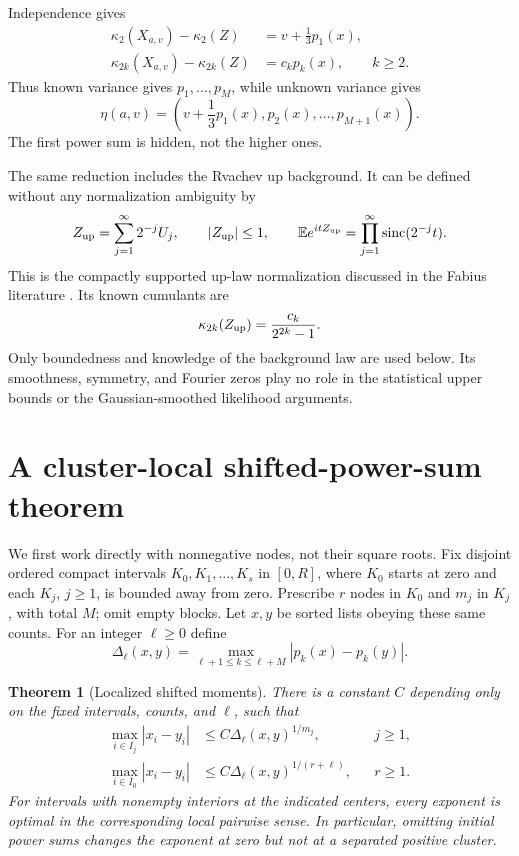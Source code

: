 \documentclass[11pt,a4paper]{article}
\numberwithin{equation}{section}
\newtheorem{theorem}{Theorem}[section]
\theoremstyle{definition}
\theoremstyle{remark}
\newcommand{\E}{\mathbb E}
\newcommand{\sinc}{\operatorname{sinc}}
\newcommand{\kap}{\kappa}
\begin{document}
Independence gives
\begin{align}
 \kap_2(X_{a,v})-\kap_2(Z)&=v+\frac13p_1(x),
 \label{eq:variancecoord}\\
 \kap_{2k}(X_{a,v})-\kap_{2k}(Z)&=c_kp_k(x),\qquad k\ge2.
 \label{eq:highcoords}
\end{align}
Thus known variance gives $p_1,\ldots,p_M$, while unknown variance gives
\begin{equation}
 \eta(a,v)=\left(v+\frac13p_1(x),p_2(x),\ldots,p_{M+1}(x)\right).
 \label{eq:eta}
\end{equation}
The first power sum is hidden, not the higher ones.

The same reduction includes the Rvachev up background. It can be defined
without any normalization ambiguity by
\begin{equation}
 Z_{\rm up}=\sum_{j=1}^\infty2^{-j}U_j,
 \qquad |Z_{\rm up}|\le1,
 \qquad \E e^{itZ_{\rm up}}=\prod_{j=1}^\infty\sinc(2^{-j}t).
 \label{eq:up}
\end{equation}
This is the compactly supported up-law normalization discussed in the Fabius
literature \cite{Arias}. Its known cumulants are
\begin{equation}
 \kap_{2k}(Z_{\rm up})=\frac{c_k}{2^{2k}-1}.
\end{equation}
Only boundedness and knowledge of the background law are used below. Its
smoothness, symmetry, and Fourier zeros play no role in the statistical upper
bounds or the Gaussian-smoothed likelihood arguments.

\section{A cluster-local shifted-power-sum theorem}
\label{sec:cluster}

We first work directly with nonnegative nodes, not their square roots.
Fix disjoint ordered compact intervals $K_0,K_1,\ldots,K_s$ in $[0,R]$,
where $K_0$ starts at zero and each $K_j$, $j\ge1$, is bounded away from zero.
Prescribe $r$ nodes in $K_0$ and $m_j$ in $K_j$, with total $M$; omit empty
blocks. Let $x,y$ be sorted lists obeying these same counts. For an integer
$\ell\ge0$ define
\begin{equation}
 \Delta_\ell(x,y)=\max_{\ell+1\le k\le\ell+M}|p_k(x)-p_k(y)|.
 \label{eq:momentmetric}
\end{equation}

\begin{theorem}[Localized shifted moments]
\label{thm:cluster}
There is a constant $C$ depending only on the fixed intervals, counts, and
$\ell$, such that
\begin{align}
 \max_{i\in I_j}|x_i-y_i|&\le C\Delta_\ell(x,y)^{1/m_j},
 &&j\ge1,\label{eq:positiveinv}\\
 \max_{i\in I_0}|x_i-y_i|&\le C\Delta_\ell(x,y)^{1/(r+\ell)},
 &&r\ge1.\label{eq:zeroinv}
\end{align}
For intervals with nonempty interiors at the indicated centers, every exponent
is optimal in the corresponding local pairwise sense. In particular, omitting
initial power sums changes the exponent at zero but not at a separated
positive cluster.
\end{theorem}
\end{document}
